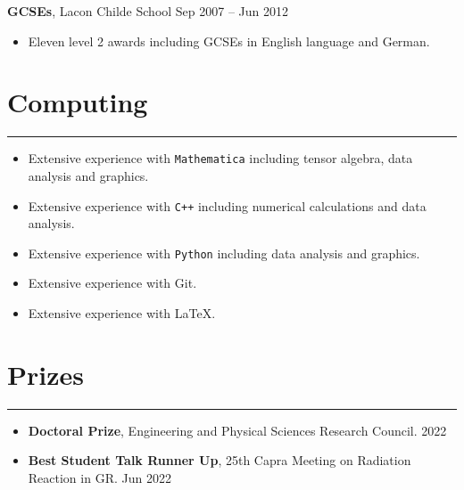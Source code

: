 \documentclass[10.5pt, oneside]{article}   	%
\begin{document}
\textbf{GCSEs}, Lacon Childe School \hfill Sep 2007 -- Jun 2012\\
\vspace{-5mm}
\begin{itemize}
\item Eleven level 2 awards including GCSEs in English language and German.
\end{itemize} 

 {\color{Sectioncolour}
\section*{Computing}
\vspace{-3mm}
\noindent\rule{\linewidth}{0.6pt}}
 \begin{itemize}
\item Extensive experience with \texttt{Mathematica} including tensor algebra, data analysis and graphics. 
\item Extensive experience with \texttt{C++} including numerical calculations and data analysis.
\item Extensive experience with \texttt{Python} including data analysis and graphics. 
\item Extensive experience with Git.
\item Extensive experience with \LaTeX.
\end{itemize}


{\color{Sectioncolour}
\section*{Prizes}
\vspace{-3mm}
\noindent\rule{\linewidth}{0.6pt}}
\begin{itemize}
\item \textbf{Doctoral Prize}, Engineering and Physical Sciences Research Council. \hfill 2022
\item \textbf{Best Student Talk Runner Up}, 25th Capra Meeting on Radiation Reaction in GR. \hfill Jun 2022 
\end{itemize}
 
\end{document}
